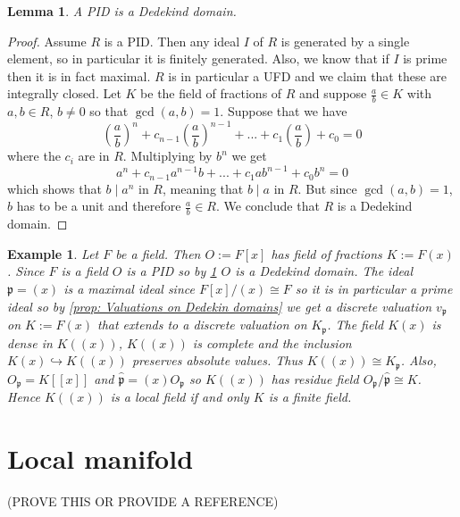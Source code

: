 \documentclass{article}
\newtheorem{lemma}{Lemma}[section]
\newtheorem{example}{Example}[section]
\newcommand{\mfrak}[1]{\mathfrak{#1}}
\begin{document}
 
\begin{lemma} \label{lem: PID is Dedekin}
    A PID is a Dedekind domain.
\end{lemma}
\begin{proof}
    Assume $R$ is a PID. Then any ideal $I$ of $R$ is generated by a single element, so in particular it is finitely generated. Also, we know that if $I$ is prime then it is in fact maximal. $R$ is in particular a UFD and we claim that these are integrally closed. Let $K$ be the field of fractions of $R$ and suppose $\frac{a}{b} \in K$ with $a,b \in R$, $b \neq 0$ so that $\gcd(a, b) = 1$. Suppose that we have
    $$(\frac{a}{b})^n + c_{n-1}(\frac{a}{b})^{n-1} + ... + c_{1}(\frac{a}{b}) + c_0 = 0$$
    where the $c_i$ are in $R$. Multiplying by $b^n$ we get
    $$a^n + c_{n-1}a^{n-1}b + ... + c_{1}ab^{n-1} + c_0 b^n = 0$$
    which shows that $b \mid a^n$ in $R$, meaning that $b \mid a$ in $R$. But since $\gcd(a,b) = 1$, $b$ has to be a unit and therefore $\frac{a}{b} \in R$. We conclude that $R$ is a Dedekind domain. 
\end{proof}


\begin{example}
    Let $F$ be a field. Then $O := F[x]$ has field of fractions $K := F(x)$. Since $F$ is a field $O$ is a PID so by \cref{lem: PID is Dedekin} $O$ is a Dedekind domain. The ideal $\mfrak p = (x)$ is a maximal ideal since $F[x] / (x) \cong F$ so it is in particular a prime ideal so by \cref{prop: Valuations on Dedekin domains} we get a discrete valuation $v_\mfrak p$ on $K := F(x)$ that extends to a discrete valuation on $K_\mfrak p$. The field $K(x)$ is dense in $K((x))$, $K((x))$ is complete and the inclusion $K(x) \hookrightarrow K((x))$ preserves absolute values. Thus $K((x)) \cong K_\mfrak p$. Also, $O_\mfrak p = K[[x]]$ and $\hat {\mfrak p} = (x)O_\mfrak p$ so $K((x))$ has residue field $O_\mfrak p / \hat {\mfrak p} \cong K$. Hence $K((x))$ is a local field if and only $K$ is a finite field. 
\end{example}



\section{Local manifold}
 

(PROVE THIS OR PROVIDE A REFERENCE) 
\end{document}
